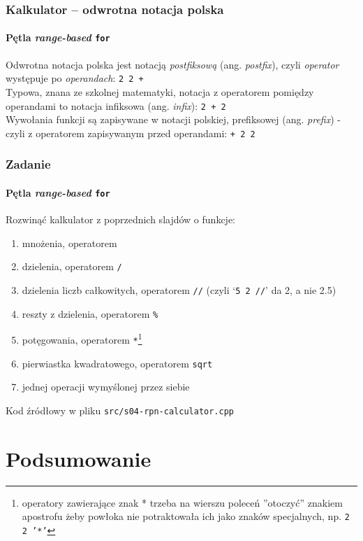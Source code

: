 \documentclass[aspectratio=169]{beamer}
\begin{document}
\begin{frame}
    \frametitle{Kalkulator -- odwrotna notacja polska}
    \framesubtitle{Pętla \emph{range-based} {\tt for}}

    Odwrotna notacja polska jest notacją \emph{postfiksową} (ang.
    \emph{postfix}), czyli \emph{operator} występuje po \emph{operandach}:
    {\tt 2 2 +}\\
    Typowa, znana ze szkolnej matematyki, notacja z operatorem pomiędzy
    operandami to notacja infiksowa (ang. \emph{infix}): {\tt 2 + 2}\\
    Wywołania funkcji są zapisywane w notacji polskiej, prefiksowej (ang.
    \emph{prefix}) - czyli z operatorem zapisywanym przed operandami: {\tt + 2
    2}
\end{frame}

\begin{frame}
    \frametitle{Zadanie}
    \framesubtitle{Pętla \emph{range-based} {\tt for}}
    \label{lecture_exercise_6}

    Rozwinąć kalkulator z poprzednich slajdów o funkcje:

    {\footnotesize
    \begin{enumerate}
        \item mnożenia, operatorem {\tt *}
        \item dzielenia, operatorem {\tt /}
        \item dzielenia liczb całkowitych, operatorem {\tt //} (czyli `{\tt 5 2
            //}' da 2, a nie 2.5)
        \item reszty z dzielenia, operatorem {\tt \%}
        \item potęgowania, operatorem {\tt **}\footnote{operatory zawierające
            znak * trzeba na wierszu poleceń ''otoczyć'' znakiem apostrofu żeby
            powłoka nie potraktowała ich jako znaków specjalnych, np. {\tt 2 2
            '*'}}
        \item pierwiastka kwadratowego, operatorem {\tt sqrt}
        \item jednej operacji wymyślonej przez siebie
    \end{enumerate}}

    Kod źródłowy w pliku {\tt src/s04-rpn-calculator.cpp}
\end{frame}

\section{Podsumowanie}
\end{document}
